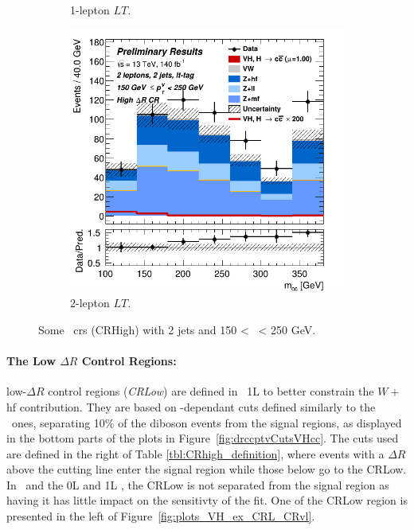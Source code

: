 \begin{figure}[h!]
\begin{subfigure}[b]{0.32\textwidth}
      \caption{1-lepton $LT$.}
      \label{fig:plots_VHcc_ex_1L_CRH}
  \end{subfigure}
  \begin{subfigure}[b]{0.32\textwidth}
    \centering
    \includegraphics[width=\textwidth]{Images/VH/Own_fit/prefit_VHcc/Region_distmBB_BMax250_BMin150_DCRHigh_J2_TTypelt_T2_L2_Y6051_Prefit.png}
    \caption{2-lepton $LT$.}
    \label{fig:plots_VHcc_ex_2L_CRH}
\end{subfigure}
  \caption{Some \highdr\ \gls{cr}s (CRHigh) with 2 jets and 150 < \ptv\ < 250 GeV.}
  \label{fig:plots_VHcc_ex_CRH}
\end{figure} 

\paragraph{The Low $\Delta R$ Control Regions:} low-$\Delta R$ control regions (\textit{CRLow}) are defined in \vhb\ 1L to better constrain the $W+$hf contribution. They are based on \ptv-dependant cuts defined similarly to the \highdr\ ones, separating 10\% of the diboson events from the signal regions, as displayed in the bottom parts of the plots in Figure~\ref{fig:drccptvCutsVHcc}. The cuts used are defined in the right of Table \ref{tbl:CRhigh_definition}, where events with a $\Delta R$ above the cutting line enter the signal region while those below go to the CRLow. In \vhc\ and the 0L and 1L \vhb, the CRLow is not separated from the signal region as having it has little impact on the sensitivty of the fit. One of the CRLow region is presented in the left of Figure~\ref{fig:plots_VH_ex_CRL_CRvl}.

